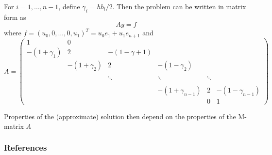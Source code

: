 \documentclass{beamer}
\begin{document}
\begin{frame} 
For $i=1,\ldots,n-1$, define $\gamma_i = {hb_i}/2$. 
Then the problem can be written in matrix form as
\begin{equation}
Ay=f
\end{equation}
where $f=(u_0,0,\ldots,0,u_1)^T=u_0e_1+u_1e_{n+1}$ and
{\footnotesize
\[
A=
\begin{pmatrix}
1 & 0 & \\
-(1+\gamma_1) & 2 & -(1-\gamma+1) & \\
& -(1+\gamma_2) & 2 & -(1-\gamma_2) & \\
& & & \\
& & \ddots & \ddots & \ddots \\
& & & \\
& & & -(1+\gamma_{n-1}) & 2 & -(1-\gamma_{n-1}) \\
& & & & 0 & 1
\end{pmatrix}
\]
}

Properties of the (approximate) solution then depend on the properties of the M-matrix $A$
\end{frame}






\begin{frame}[allowframebreaks]
\frametitle{References}


\end{frame}

\begin{frame}
\end{frame}
\end{document}

